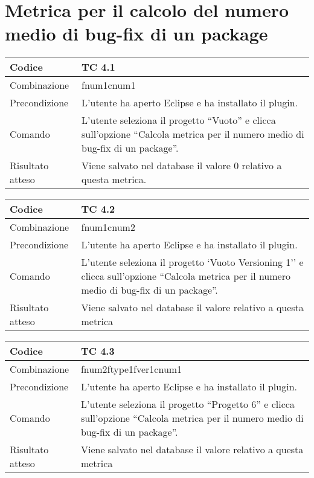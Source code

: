 \clearpage

\section{Metrica per il calcolo del numero medio di bug-fix di un package}

\begin{table}[ht]
\begin{tabular}{|p{3cm}|p{9cm}|}
\hline
\cellcolor{lightgray}Codice				& TC 4.1								\\
\hline
\cellcolor{lightgray}Combinazione		& fnum1cnum1									\\
\hline
\cellcolor{lightgray}Precondizione		& L'utente ha aperto Eclipse e ha installato il plugin.		\\
\hline
\cellcolor{lightgray}Comando			& L'utente seleziona il progetto ``Vuoto''  e clicca sull'opzione ``Calcola metrica per il numero medio di bug-fix di un package''.	\\
\hline
\cellcolor{lightgray}Risultato atteso	& Viene salvato nel database il valore 0 relativo a questa metrica.\\
\hline
\end{tabular}
\end{table}

\begin{table}[ht]
\begin{tabular}{|p{3cm}|p{9cm}|}
\hline
\cellcolor{lightgray}Codice				& TC 4.2								\\
\hline
\cellcolor{lightgray}Combinazione		& fnum1cnum2 									\\
\hline
\cellcolor{lightgray}Precondizione		& L'utente ha aperto Eclipse e ha installato il plugin.				\\
\hline
\cellcolor{lightgray}Comando			& L'utente seleziona il progetto `Vuoto Versioning 1''  e clicca sull'opzione ``Calcola metrica per il numero medio di bug-fix di un package''.	\\
\hline
\cellcolor{lightgray}Risultato atteso	& Viene salvato nel database il valore relativo a questa metrica	\\
\hline
\end{tabular}
\end{table}

\begin{table}[ht]
\begin{tabular}{|p{3cm}|p{9cm}|}
\hline
\cellcolor{lightgray}Codice				& TC 4.3								\\
\hline
\cellcolor{lightgray}Combinazione		& fnum2ftype1fver1cnum1									\\
\hline
\cellcolor{lightgray}Precondizione		& L'utente ha aperto Eclipse e ha installato il plugin.					\\
\hline
\cellcolor{lightgray}Comando			& L'utente seleziona il progetto ``Progetto 6''  e clicca sull'opzione ``Calcola metrica per il numero medio di bug-fix di un package''.	\\
\hline
\cellcolor{lightgray}Risultato atteso	& Viene salvato nel database il valore relativo a questa metrica	\\
\hline
\end{tabular}
\end{table}


